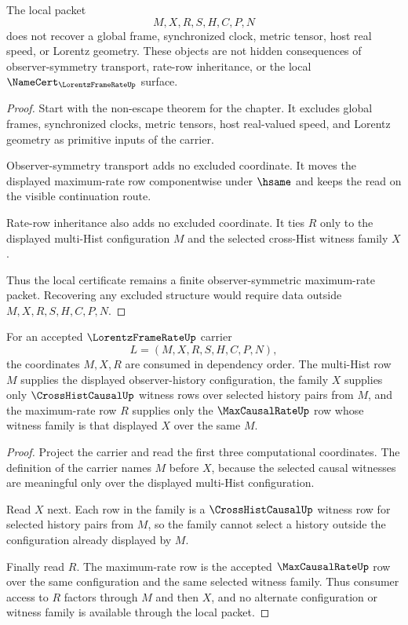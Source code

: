 \begin{theorem}
\label{thm:frame-rate-locality-nonescape}
The local packet
$$
M,X,R,S,H,C,P,N
$$
does not recover a global frame, synchronized clock, metric tensor, host real speed, or Lorentz geometry. These objects are not hidden consequences of observer-symmetry transport, rate-row inheritance, or the local $\NameCert_{\LorentzFrameRateUp}$ surface.
\end{theorem}
\begin{proof}
Start with the non-escape theorem for the chapter. It excludes global frames, synchronized clocks, metric tensors, host real-valued speed, and Lorentz geometry as primitive inputs of the carrier.

Observer-symmetry transport adds no excluded coordinate. It moves the displayed maximum-rate row componentwise under $\hsame$ and keeps the read on the visible continuation route.

Rate-row inheritance also adds no excluded coordinate. It ties $R$ only to the displayed multi-Hist configuration $M$ and the selected cross-Hist witness family $X$.

Thus the local certificate remains a finite observer-symmetric maximum-rate packet. Recovering any excluded structure would require data outside $M,X,R,S,H,C,P,N$.
\end{proof}

\begin{theorem}
\label{thm:lorentz-frame-rate-configuration-causal-inheritance}
For an accepted $\LorentzFrameRateUp$ carrier
$$
L=(M,X,R,S,H,C,P,N),
$$
the coordinates $M,X,R$ are consumed in dependency order. The multi-Hist row $M$ supplies the displayed observer-history configuration, the family $X$ supplies only $\CrossHistCausalUp$ witness rows over selected history pairs from $M$, and the maximum-rate row $R$ supplies only the $\MaxCausalRateUp$ row whose witness family is that displayed $X$ over the same $M$.
\end{theorem}
\begin{proof}
Project the carrier and read the first three computational coordinates. The definition of the carrier names $M$ before $X$, because the selected causal witnesses are meaningful only over the displayed multi-Hist configuration.

Read $X$ next. Each row in the family is a $\CrossHistCausalUp$ witness row for selected history pairs from $M$, so the family cannot select a history outside the configuration already displayed by $M$.

Finally read $R$. The maximum-rate row is the accepted $\MaxCausalRateUp$ row over the same configuration and the same selected witness family. Thus consumer access to $R$ factors through $M$ and then $X$, and no alternate configuration or witness family is available through the local packet.
\end{proof}

